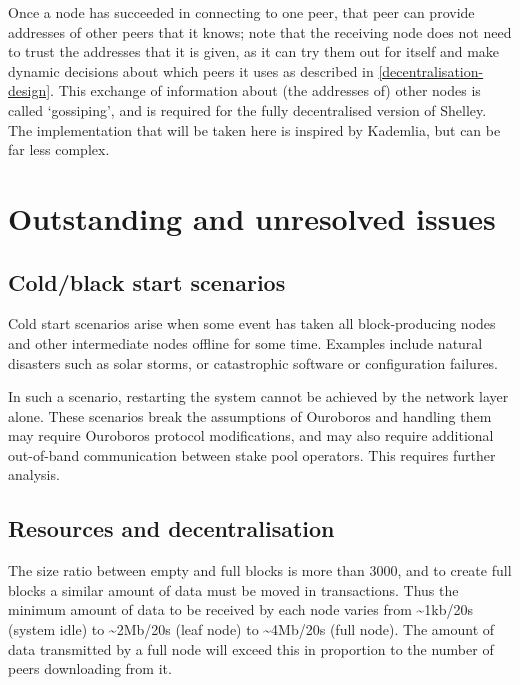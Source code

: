 \documentclass[11pt,a4paper]{article}
\begin{document}
Once a node has succeeded in connecting to one peer, that peer can
provide addresses of other peers that it knows; note that the receiving
node does not need to trust the addresses that it is given, as it can
try them out for itself and make dynamic decisions about which peers it
uses as described in \cref{decentralisation-design}. This exchange of
information about (the addresses of) other nodes is called `gossiping',
and is required for the fully decentralised version of Shelley. The
implementation that will be taken here is inspired by Kademlia, but can
be far less complex.

\section{Outstanding and unresolved issues}
\label{outstanding-unresolved-issues}

\subsection{Cold/black start scenarios}
\label{coldblack-start-scenarios}

Cold start scenarios arise when some event has taken all block-producing
nodes and other intermediate nodes offline for some time. Examples
include natural disasters such as solar storms, or catastrophic software
or configuration failures.

In such a scenario, restarting the system cannot be achieved by the
network layer alone. These scenarios break the assumptions of Ouroboros
and handling them may require Ouroboros protocol modifications, and may
also require additional out-of-band communication between stake pool
operators. This requires further analysis.

\subsection{Resources and decentralisation}
\label{resources-and-decentralisation}

The size ratio between empty and full blocks is more than 3000, and to
create full blocks a similar amount of data must be moved in
transactions. Thus the minimum amount of data to be received by each
node varies from \textasciitilde{}1kb/20s (system idle) to
\textasciitilde{}2Mb/20s (leaf node) to \textasciitilde{}4Mb/20s (full
node). The amount of data transmitted by a full node will exceed this in
proportion to the number of peers downloading from it.
\end{document}

